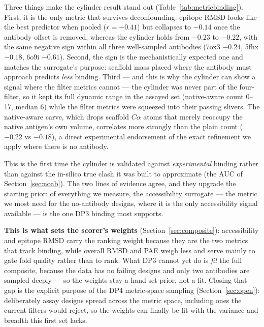 Three things make the cylinder result stand out (Table~\ref{tab:metricbinding}). First, it is the
only metric that survives deconfounding: epitope RMSD looks like the best predictor when pooled
($r=-0.41$) but collapses to $-0.14$ once the antibody offset is removed, whereas the cylinder
holds from $-0.23$ to $-0.22$, with the same negative sign within all three well-sampled
antibodies (7ox3 $-0.24$, 5fhx $-0.18$, 6o9i $-0.61$). Second, the sign is the mechanistically
expected one and matches the surrogate's purpose: scaffold mass placed where the antibody must
approach predicts \emph{less} binding. Third --- and this is why the cylinder can show a signal
where the filter metrics cannot --- the cylinder was never part of the four-filter, so it kept
its full dynamic range in the assayed set (native-aware count \numrange{0}{17}, median \num{6})
while the filter metrics were squeezed into their passing slivers. The native-aware carve, which
drops scaffold $C\alpha$ atoms that merely reoccupy the native antigen's own volume, correlates
more strongly than the plain count ($-0.22$ vs $-0.18$), a direct experimental endorsement of the
exact refinement we apply where there is no antibody.

This is the first time the cylinder is validated against \emph{experimental} binding rather than
against the in-silico true clash it was built to approximate (the AUC of Section~\ref{sec:noab}).
The two lines of evidence agree, and they upgrade the starting prior: of everything we measure,
the accessibility surrogate --- the metric we most need for the no-antibody designs, where it is
the only accessibility signal available --- is the one DP3 binding most supports.

\textbf{This is what sets the scorer's weights} (Section~\ref{sec:composite}): accessibility and
epitope RMSD carry the ranking weight because they are the two metrics that track binding, while
overall RMSD and PAE weigh less and serve mainly to gate fold quality rather than to rank. What DP3
cannot yet do is \emph{fit} the full composite,
because the data has no failing designs and only two antibodies are sampled deeply --- so the
weights stay a hand-set prior, not a fit. Closing that gap is the explicit purpose of the DP4
metric-space sampling (Section~\ref{sec:open}): deliberately assay designs spread across the metric
space, including ones the current filters would reject, so the weights can finally be fit with the
variance and breadth this first set lacks.
